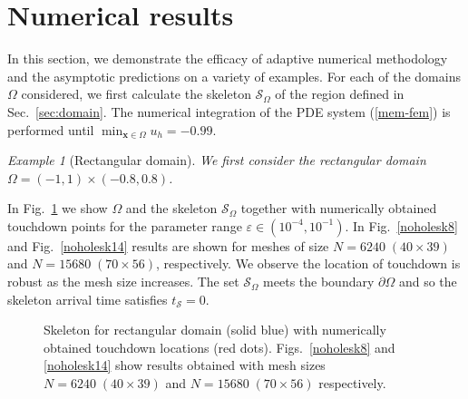 \documentclass{siamart0516}
\renewcommand{\eqref}[1]{(\ref{#1})}
\newcommand{\eps}{\varepsilon}
\newcommand{\bx}{\mathbf{x}}
\newcommand{\skel}{\mathcal{S}_{\Omega}}
\newcommand{\sat}{t_{\mathcal{S}}}
\theoremstyle{plain}%
\theoremstyle{definition}
\theoremstyle{remark}
\newtheorem{exam}{\hspace{1mm}Example}[section]
\begin{document}
\section{Numerical results}
\label{SEC:numericalresults}

In this section, we demonstrate the efficacy of adaptive numerical methodology and the asymptotic predictions on a variety of examples. For each of the domains $\Omega$ considered, we first calculate the skeleton $\skel$ of the region defined in Sec.~\ref{sec:domain}. The numerical integration of the PDE system \eqref{mem-fem} is performed until $\min_{\bx \in \Omega} u_h =-0.99$.
%

\vspace{10pt}

 \begin{exam}[Rectangular domain]
 {\em We first consider the rectangular domain $\Omega = (-1,1)\times (-0.8,0.8)$.}
 \end{exam}

In Fig.~\ref{noholesk} we show $\Omega$ and the skeleton $\skel$ together with numerically obtained touchdown points for the parameter range $\eps\in(10^{-4},10^{-1})$.  In Fig.~\ref{noholesk8} and Fig.~\ref{noholesk14} results are shown for meshes of size $N = 6240\; (40 \times 39)$ and  $N = 15680\; (70 \times 56)$, respectively. We observe the location of touchdown is robust as the mesh size increases. The set $\skel$ meets the boundary $\partial\Omega$ and so the skeleton arrival time satisfies $\sat=0$.

 \begin{figure}[htbp]
\centering
{}\quad\quad\quad
{}\quad
\caption{Skeleton for rectangular domain (solid blue) with numerically obtained touchdown locations (red dots). Figs.~\ref{noholesk8} and \ref{noholesk14} show results obtained with mesh sizes $N = 6240\; (40 \times 39)$ and $N = 15680\; (70 \times 56)$ respectively.\label{noholesk}}
\end{figure}
\end{document}
